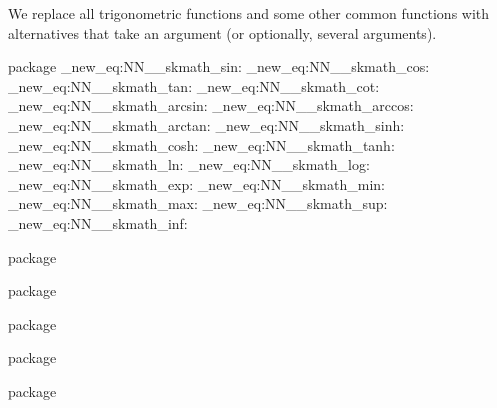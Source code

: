 \documentclass[commonsets,load]{skdoc}
\begin{document}
  We replace all trigonometric functions and some other
  common functions with alternatives that take an argument
  (or optionally, several arguments).
\begin{MacroCode}{package}
\cs_new_eq:NN\__skmath_sin:\sin
\cs_new_eq:NN\__skmath_cos:\cos
\cs_new_eq:NN\__skmath_tan:\tan
\cs_new_eq:NN\__skmath_cot:\cot
\cs_new_eq:NN\__skmath_arcsin:\arcsin
\cs_new_eq:NN\__skmath_arccos:\arccos
\cs_new_eq:NN\__skmath_arctan:\arctan
\cs_new_eq:NN\__skmath_sinh:\sinh
\cs_new_eq:NN\__skmath_cosh:\cosh
\cs_new_eq:NN\__skmath_tanh:\tanh
\cs_new_eq:NN\__skmath_ln:\log
\cs_new_eq:NN\__skmath_log:\log
\cs_new_eq:NN\__skmath_exp:\exp
\cs_new_eq:NN\__skmath_min:\min
\cs_new_eq:NN\__skmath_max:\max
\cs_new_eq:NN\__skmath_sup:\sup
\cs_new_eq:NN\__skmath_inf:\inf
\end{MacroCode}
  \begin{macro}{\sin}
\begin{MacroCode}{package}
\RenewDocumentCommand{}
\end{MacroCode}
  \end{macro}
  \begin{macro}{\cos}
\begin{MacroCode}{package}
\RenewDocumentCommand{}
\end{MacroCode}
  \end{macro}
  \begin{macro}{\tan}
\begin{MacroCode}{package}
\RenewDocumentCommand{}
\end{MacroCode}
  \end{macro}
  \begin{macro}{\cot}
\begin{MacroCode}{package}
\RenewDocumentCommand{}
\end{MacroCode}
  \end{macro}
  \begin{macro}{\arcsin}
\begin{MacroCode}{package}
\RenewDocumentCommand{}
\end{MacroCode}
  \end{macro}
\end{document}
